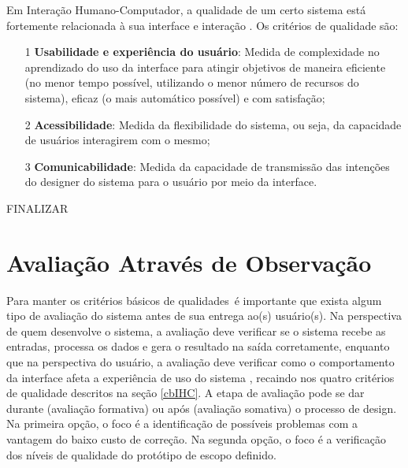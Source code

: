 \indent Em Interação Humano-Computador, a qualidade de um certo sistema está fortemente relacionada à sua interface e interação \cite[p. 28]{IHCbook}. Os critérios de qualidade são:
\begin{itemize}
\item[1] \textbf{Usabilidade e experiência do usuário}: Medida de complexidade no aprendizado do uso da interface para atingir objetivos de maneira eficiente (no menor tempo possível, utilizando o menor número de recursos do sistema), eficaz (o mais automático possível) e com satisfação;
\item[2] \textbf{Acessibilidade}: Medida da flexibilidade do sistema, ou seja, da capacidade de usuários interagirem com o mesmo;
\item[3] \textbf{Comunicabilidade}: Medida da capacidade de transmissão das intenções do designer do sistema para o usuário por meio da interface. %
\end{itemize}

\indent FINALIZAR

\section{Avaliação Através de Observação}

\indent Para manter os critérios básicos de qualidades\ é importante que exista algum tipo de avaliação do sistema antes de sua entrega ao(s) usuário(s). Na perspectiva de quem desenvolve o sistema, a avaliação deve verificar se o sistema recebe as entradas, processa os dados e gera o resultado na saída corretamente, enquanto que na perspectiva do usuário, a avaliação deve verificar como o comportamento da interface afeta a experiência de uso do sistema \cite[p. 286]{IHCbook}, recaindo nos quatro critérios de qualidade descritos na seção \ref{cbIHC}. A etapa de avaliação pode se dar durante (avaliação formativa) ou após (avaliação somativa) o processo de design. Na primeira opção, o foco é a identificação de possíveis problemas com a vantagem do baixo custo de correção. Na segunda opção, o foco é a verificação dos níveis de qualidade do protótipo de escopo definido. \cite[p. 294]{IHCbook}

